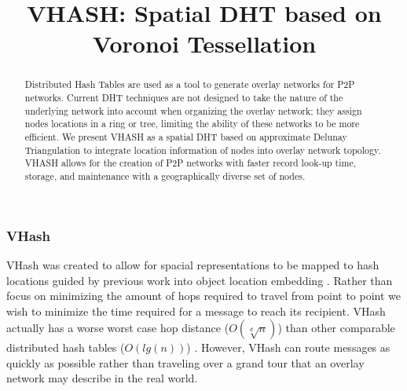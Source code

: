 \documentclass{article}
\title{VHASH: Spatial DHT based on Voronoi Tessellation}
\author{}
\date{} %
\begin{document}



\maketitle
\vspace*{-0.6in}
\begin{abstract}
Distributed Hash Tables are used as a tool to generate overlay networks for P2P networks. Current DHT techniques are not designed to take the nature of the underlying network into account when organizing the overlay network; they assign nodes locations in a ring or tree, limiting the ability of these networks to be more efficient. We present VHASH as a spatial DHT based on approximate Delunay Triangulation to integrate location information of nodes into overlay network topology. VHASH allows for the creation of P2P networks with faster record look-up time, storage, and maintenance with a geographically diverse set of nodes.
\end{abstract}



\subsubsection*{VHash}



VHash was created to allow for spacial representations to be mapped to hash locations guided by previous work into object location embedding \citep{voronet}. Rather than focus on minimizing the amount of hops required to travel from point to point we wish to minimize the time required for a message to reach its recipient. VHash actually has a worse worst case hop distance ($O(\sqrt[d]{n})$) than other comparable distributed hash tables ($O(lg(n))$) \citep{chord}. However, VHash can route messages as quickly as possible rather than traveling over a grand tour that an overlay network may describe in the real world.


\end{document}
